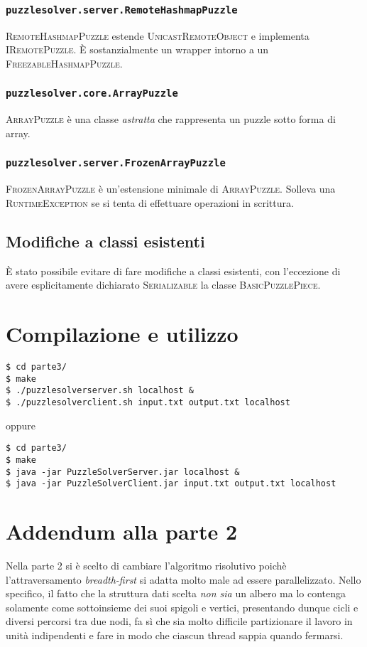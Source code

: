 \documentclass[a4paper]{article}
\newcommand{\Classname}[1]{\textsc{#1}}
\newcommand{\Ifacename}[1]{\textsc{#1}}
\begin{document}
\subsubsection{\texttt{puzzlesolver.server.RemoteHashmapPuzzle}}
\Classname{RemoteHashmapPuzzle} estende \Classname{UnicastRemoteObject} e implementa \Classname{IRemotePuzzle}.
\`E sostanzialmente un wrapper intorno a un \Classname{FreezableHashmapPuzzle}.
\subsubsection{\texttt{puzzlesolver.core.ArrayPuzzle}}
\Classname{ArrayPuzzle} \`e una classe \emph{astratta} che rappresenta un puzzle sotto forma di array.
\subsubsection{\texttt{puzzlesolver.server.FrozenArrayPuzzle}}
\Classname{FrozenArrayPuzzle} \`e un'estensione minimale di \Classname{ArrayPuzzle}.
Solleva una \Classname{RuntimeException} se si tenta di effettuare operazioni in scrittura.

\subsection{Modifiche a classi esistenti}
\`E stato possibile evitare di fare modifiche a classi esistenti, con l'eccezione di avere esplicitamente dichiarato \Ifacename{Serializable} la classe \Classname{BasicPuzzlePiece}.

\section{Compilazione e utilizzo}
\begin{verbatim}
$ cd parte3/ 
$ make
$ ./puzzlesolverserver.sh localhost &
$ ./puzzlesolverclient.sh input.txt output.txt localhost
\end{verbatim}
oppure
\begin{verbatim}
$ cd parte3/ 
$ make
$ java -jar PuzzleSolverServer.jar localhost &
$ java -jar PuzzleSolverClient.jar input.txt output.txt localhost
\end{verbatim}

% 
\appendix
\section{Addendum alla parte 2}
Nella parte 2 si \`e scelto di cambiare l'algoritmo risolutivo poich\`e l'attraversamento \emph{breadth-first} si adatta molto male ad essere parallelizzato.
Nello specifico, il fatto che la struttura dati scelta \emph{non sia} un albero ma lo contenga solamente come sottoinsieme dei suoi spigoli e vertici, presentando dunque cicli e diversi percorsi tra due nodi, fa s\`i che sia molto difficile partizionare il lavoro in unit\`a indipendenti e fare in modo che ciascun thread sappia quando fermarsi.
\end{document}
